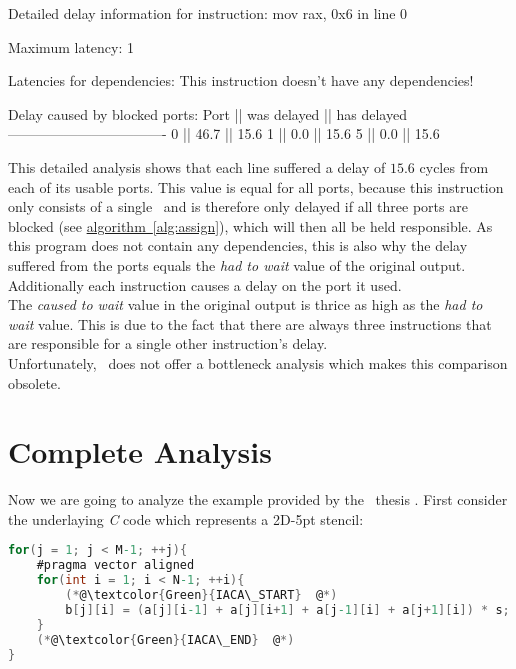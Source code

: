 \begin{example}
Detailed delay information for instruction: mov rax, 0x6 in line 0
    
            Maximum latency: 1
            
            Latencies for dependencies:
            This instruction doesn't have any dependencies!
                      
            Delay caused by blocked ports:
             Port || was delayed || has delayed
             ----------------------------------
              0   ||    46.7     ||    15.6
              1   ||     0.0     ||    15.6
              5   ||     0.0     ||    15.6
\end{example}

This detailed analysis shows that each line suffered a delay of $15.6$ cycles from each of its usable ports. This value is equal for all ports, because this instruction only consists of a single \microop\ and is therefore only delayed if all three ports are blocked (see \hyperref[alg:assign]{algorithm~\ref*{alg:assign}}), which will then all be held responsible. As this program does not contain any dependencies, this is also why the delay suffered from the ports equals the \emph{had to wait} value of the original output. Additionally each instruction causes a delay on the port it used.\\
The \emph{caused to wait} value in the original output is thrice as high as the \emph{had to wait} value. This is due to the fact that there are always three instructions that are responsible for a single other instruction's delay.\\

Unfortunately, \osaca\ does not offer a bottleneck analysis which makes this comparison obsolete.


\section{Complete Analysis}

Now we are going to analyze the example provided by the \osaca\ thesis \cite{osaca-thesis}. First consider the underlaying \emph{C} code which represents a 2D-5pt stencil:


\begin{mdframed}[backgroundcolor=light-gray, roundcorner=10pt,leftmargin=1, rightmargin=1, innerleftmargin=15, innertopmargin=1,innerbottommargin=1, outerlinewidth=1, linecolor=light-gray]
    \begin{lstlisting}[language=C, basicstyle=\scriptsize]
for(j = 1; j < M-1; ++j){
    #pragma vector aligned
    for(int i = 1; i < N-1; ++i){
        (*@\textcolor{Green}{IACA\_START}  @*)
        b[j][i] = (a[j][i-1] + a[j][i+1] + a[j-1][i] + a[j+1][i]) * s;
    }
    (*@\textcolor{Green}{IACA\_END}  @*)
}
    \end{lstlisting}
\end{mdframed}

